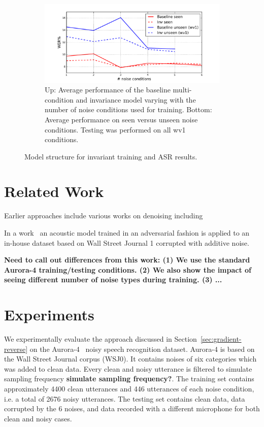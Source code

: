 \documentclass{article}
\begin{document}
\begin{figure}
\begin{subfigure}[b]{0.7\linewidth}
        \includegraphics[width=\linewidth]{wer_seen_unseen.pdf}
        \caption{Up: Average performance of the baseline multi-condition and invariance model varying with  the number of noise
            conditions used for training. Bottom: Average performance on seen versus unseen noise conditions.
            Testing was performed on all wv1 conditions.
            }
        \label{fig:results}
    \end{subfigure}
    \caption{Model structure for invariant training and ASR results.}
\end{figure}

\section{Related Work}
    Earlier approaches include various works on denoising including 

    In a work~\cite{yusuke2016adversarial} an acoustic model trained in an adversarial fashion is
    applied to an in-house dataset based on Wall Street Journal 1 corrupted with additive noise.
    
    {\bf Need to call out differences from this work: (1) We use the standard Aurora-4 training/testing conditions. (2) We also show the impact of seeing different number of noise types during training. (3) ...}

\section{Experiments}
\label{sec:experiments}
We experimentally evaluate the approach discussed in Section~\ref{sec:gradient-reverse} 
on the Aurora-4~\cite{parihar2002aurora} noisy speech recognition dataset. Aurora-4
is based on the Wall Street Journal corpus (WSJ0). It contains noises of 
six categories which was added to clean
data. Every clean and noisy utterance is filtered to simulate sampling frequency {\bf simulate sampling frequency?}. The training
set contains approximately 4400 clean utterances and 446 utterances of each noise condition,
i.e. a total of 2676 noisy utterances.
The testing
set contains clean data, data corrupted by the 6 noises, and data recorded with a different microphone
for both clean and noisy cases.
\end{document}
